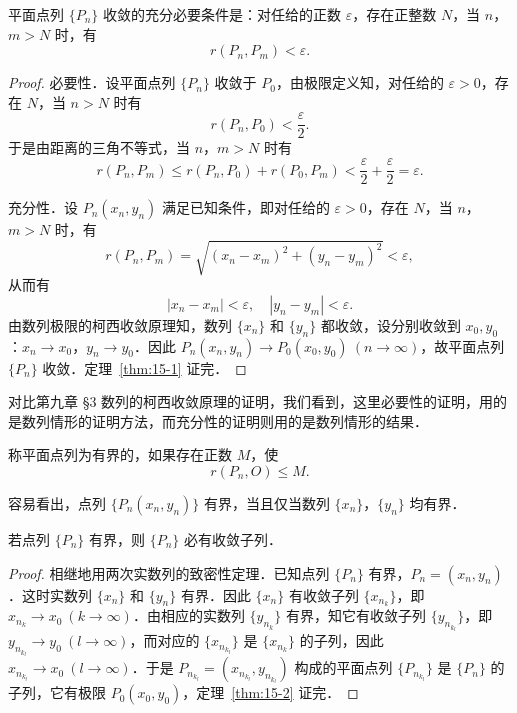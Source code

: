 \begin{theorem}[柯西收敛原理]\label{thm:15-1}
平面点列 $\{P_{n}\}$ 收敛的充分必要条件是：对任给的正数 $\varepsilon$，存在正整数 $N$，当 $n$，$m>N$ 时，有
\begin{equation}
r\left(P_{n},P_{m}\right)<\varepsilon.
\tag{2}
\end{equation}
\end{theorem}

\begin{proof}
必要性．设平面点列 $\{P_{n}\}$ 收敛于 $P_{0}$，由极限定义知，对任给的 $\varepsilon>0$，存在 $N$，当 $n>N$ 时有
\[
r\left(P_{n},P_{0}\right)<\frac{\varepsilon}{2}.
\]
于是由距离的三角不等式，当 $n$，$m>N$ 时有
\[
r\left(P_{n},P_{m}\right)\leqslant r\left(P_{n},P_{0}\right)+r\left(P_{0},P_{m}\right)<\frac{\varepsilon}{2}+\frac{\varepsilon}{2}=\varepsilon.
\]

充分性．设 $P_{n}(x_{n},y_{n})$ 满足已知条件，即对任给的 $\varepsilon>0$，存在 $N$，当 $n$，$m>N$ 时，有
\[
r\left(P_{n},P_{m}\right)=\sqrt{\left(x_{n}-x_{m}\right)^{2}+\left(y_{n}-y_{m}\right)^{2}}<\varepsilon,
\]
从而有
\[
\left|x_{n}-x_{m}\right|<\varepsilon,\quad\left|y_{n}-y_{m}\right|<\varepsilon.
\]
由数列极限的柯西收敛原理知，数列 $\{x_{n}\}$ 和 $\{y_{n}\}$ 都收敛，设分别收敛到 $x_{0},y_{0}$：$x_{n}\to x_{0}$，$y_{n}\to y_{0}$．因此 $P_{n}(x_{n},y_{n})\to P_{0}(x_{0},y_{0})\ (n\to\infty)$，故平面点列 $\{P_{n}\}$ 收敛．定理~\ref{thm:15-1} 证完．
\end{proof}

对比第九章 §3 数列的柯西收敛原理的证明，我们看到，这里必要性的证明，用的是数列情形的证明方法，而充分性的证明则用的是数列情形的结果．

\begin{definition}\label{def:15-2}
称平面点列为有界的，如果存在正数 $M$，使
\[
r\left(P_{n},O\right)\leqslant M.
\]
\end{definition}

容易看出，点列 $\{P_{n}(x_{n},y_{n})\}$ 有界，当且仅当数列 $\{x_{n}\}$，$\{y_{n}\}$ 均有界．

\begin{theorem}\label{thm:15-2}
若点列 $\{P_{n}\}$ 有界，则 $\{P_{n}\}$ 必有收敛子列．
\end{theorem}

\begin{proof}
相继地用两次实数列的致密性定理．已知点列 $\{P_{n}\}$ 有界，$P_{n}=(x_{n},y_{n})$．这时实数列 $\{x_{n}\}$ 和 $\{y_{n}\}$ 有界．因此 $\{x_{n}\}$ 有收敛子列 $\{x_{n_{k}}\}$，即 $x_{n_{k}}\to x_{0}\ (k\to\infty)$．由相应的实数列 $\{y_{n_{k}}\}$ 有界，知它有收敛子列 $\{y_{n_{k_{l}}}\}$，即 $y_{n_{k_{l}}}\to y_{0}\ (l\to\infty)$，而对应的 $\{x_{n_{k_{l}}}\}$ 是 $\{x_{n_{k}}\}$ 的子列，因此 $x_{n_{k_{l}}}\to x_{0}\ (l\to\infty)$．于是 $P_{n_{k_{l}}}=(x_{n_{k_{l}}},y_{n_{k_{l}}})$ 构成的平面点列 $\{P_{n_{k_{l}}}\}$ 是 $\{P_{n}\}$ 的子列，它有极限 $P_{0}(x_{0},y_{0})$，定理~\ref{thm:15-2} 证完．
\end{proof}

